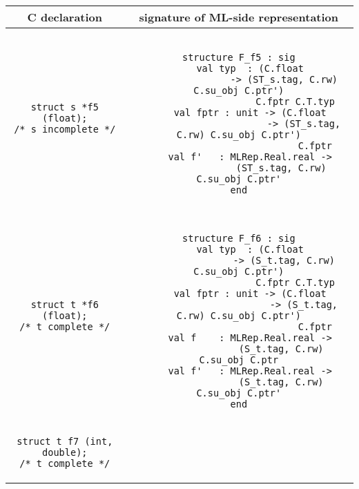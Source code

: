 \documentclass[titlepage,letterpaper]{article}
\begin{document}
\begin{small}
\begin{center}
\begin{tabular}{c|c}
C declaration & signature of ML-side representation \\ \hline\hline
\begin{minipage}{2in}
\begin{verbatim}
struct s *f5 (float);
/* s incomplete */
\end{verbatim}
\end{minipage}
&
\begin{minipage}{4in}
\begin{verbatim}

structure F_f5 : sig
    val typ  : (C.float
                -> (ST_s.tag, C.rw) C.su_obj C.ptr')
                    C.fptr C.T.typ
    val fptr : unit -> (C.float
                       -> (ST_s.tag, C.rw) C.su_obj C.ptr')
                           C.fptr
    val f'   : MLRep.Real.real ->
               (ST_s.tag, C.rw) C.su_obj C.ptr'
end

\end{verbatim}
\end{minipage}
\\ \hline
\begin{minipage}{2in}
\begin{verbatim}
struct t *f6 (float);
/* t complete */
\end{verbatim}
\end{minipage}
&
\begin{minipage}{4in}
\begin{verbatim}

structure F_f6 : sig
    val typ  : (C.float
                -> (S_t.tag, C.rw) C.su_obj C.ptr')
                    C.fptr C.T.typ
    val fptr : unit -> (C.float
                       -> (S_t.tag, C.rw) C.su_obj C.ptr')
                           C.fptr
    val f    : MLRep.Real.real ->
               (S_t.tag, C.rw) C.su_obj C.ptr
    val f'   : MLRep.Real.real ->
               (S_t.tag, C.rw) C.su_obj C.ptr'
end

\end{verbatim}
\end{minipage}
\\ \hline
\begin{minipage}{2in}
\begin{verbatim}
struct t f7 (int, double);
/* t complete */
\end{verbatim}
\end{minipage}
&
\begin{minipage}{4in}
\begin{verbatim}


\end{verbatim}
\end{minipage}
\end{tabular}
\end{center}
\end{small}
\end{document}
